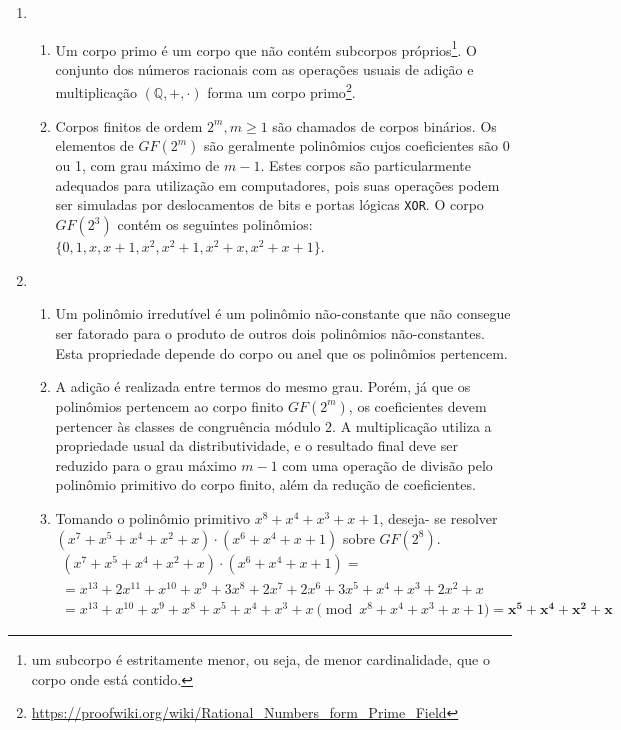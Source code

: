\documentclass[fleqn]{../sftex/sftex}
\begin{document}
\begin{enumerate}[label= (\textbf{\arabic*})]
\begin{enumerate}
\end{enumerate}

\item

\begin{enumerate}

\item Um corpo primo é um corpo que não contém subcorpos próprios\footnote{um
subcorpo é estritamente menor, ou seja, de menor cardinalidade, que o corpo
onde está contido.}. O conjunto dos números racionais com as operações usuais
de adição e multiplicação $(\mathbb{Q}, +, \cdot)$ forma um corpo
primo\footnote{\url{
https://proofwiki.org/wiki/Rational_Numbers_form_Prime_Field}}.

\item Corpos finitos de ordem $2^m, m \geq 1$ são chamados de corpos binários.
Os elementos de $GF(2^m)$ são geralmente polinômios cujos coeficientes são 0
ou 1, com grau máximo de $m - 1$. Estes corpos são particularmente adequados
para utilização em computadores, pois suas operações podem ser simuladas por
deslocamentos de bits e portas lógicas \texttt{XOR}. O corpo $GF(2^3)$ contém
os seguintes polinômios:
$\{0, 1, x, x + 1, x^2, x^2 + 1, x^2 + x, x^2 + x + 1\}$.

\end{enumerate}

\item

\begin{enumerate}

\item Um polinômio irredutível é um polinômio não-constante que não consegue
ser fatorado para o produto de outros dois polinômios não-constantes. Esta
propriedade depende do corpo ou anel que os polinômios pertencem.

\item A adição é realizada entre termos do mesmo grau. Porém, já que os
polinômios pertencem ao corpo finito $GF(2^m)$, os coeficientes devem pertencer
às classes de congruência módulo $2$. A multiplicação utiliza a propriedade
usual da distributividade, e o resultado final deve ser reduzido para o grau
máximo $m - 1$ com uma operação de divisão pelo polinômio primitivo do corpo
finito, além da redução de coeficientes.

\item Tomando o polinômio primitivo $x^8 + x^4 + x^3 + x + 1$, deseja- se
resolver $(x^7 + x^5 + x^4 + x^2 + x) \cdot (x^6 + x^4 + x + 1)$ sobre
$GF(2^8)$.
\begin{multline*}
(x^7 + x^5 + x^4 + x^2 + x) \cdot (x^6 + x^4 + x + 1) = \\
= x^{13} + 2x^{11} + x^{10} + x^9 + 3x^8 + 2x^7
+ 2x^6 + 3x^5 + x^4 + x^3 + 2x^2 + x \\
= x^{13} + x^{10} + x^9 + x^8 + x^5 + x^4 + x^3 + x
\pmod{x^8 + x^4 + x^3 + x + 1}
= \boldsymbol{x^5 + x^4 + x^2 + x}
\end{multline*}


\end{enumerate}
\end{enumerate}
\end{document}
